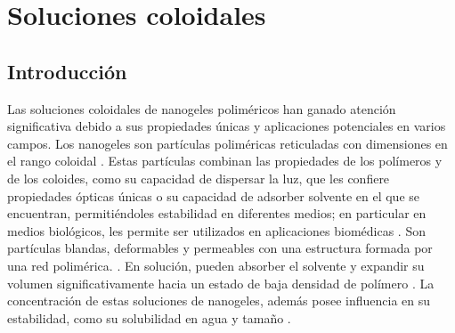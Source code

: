 \chapter{Soluciones coloidales} \label{chapter:mc:soluciones}
	

	
	\section{Introducci\'on}
	
	Las soluciones coloidales de nanogeles polim\'ericos han ganado atenci\'on significativa debido a sus propiedades \'unicas y aplicaciones potenciales en varios campos. Los nanogeles son part\'iculas polim\'ericas reticuladas con dimensiones en el rango coloidal \cite{10.1002/pola.27653}. Estas part\'iculas combinan las propiedades de los pol\'imeros y de los coloides, como su capacidad de dispersar la luz, que les confiere propiedades \'opticas \'unicas o su capacidad de adsorber solvente en el que se encuentran, permiti\'endoles estabilidad en diferentes medios; en particular en medios biol\'ogicos, les permite ser utilizados en aplicaciones biom\'edicas \cite{lyon2012polymer}. Son part\'iculas blandas, deformables y permeables con una estructura formada por una red polim\'erica. \cite{lyon2012polymer}. En soluci\'on, pueden absorber el solvente y expandir su volumen significativamente hacia un estado de baja densidad de pol\'imero \cite{karg2019nanogels, perez2021thermodynamic}. La concentraci\'on de estas soluciones de nanogeles, adem\'as posee influencia en su estabilidad, como su solubilidad en agua y tama\~no \cite{10.3390/polym13234071}. 
	

